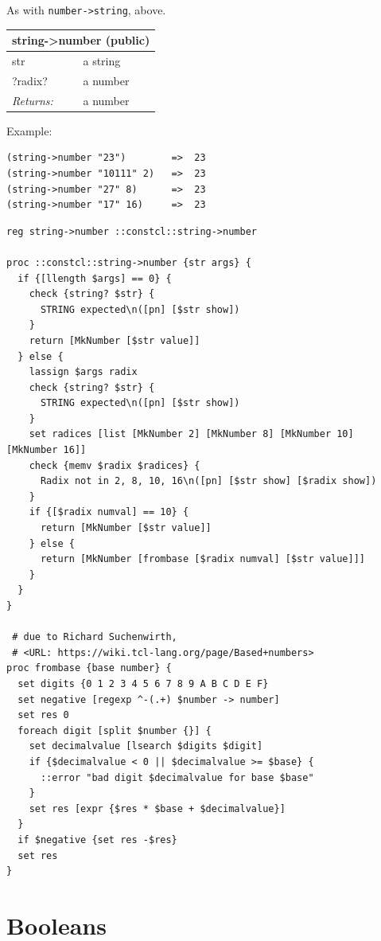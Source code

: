 \documentclass[twoside,9pt]{report}
\begin{document}
As with \texttt{number->string}, above.

\begin{tabular}{ |l l| }
\hline
\multicolumn{2}{|l|}{string->number (public)} \\
\hline
str & a string \\
?radix? & a number \\
\textit{Returns:} & a number \\
\hline
\end{tabular}


Example:

\noindent\makebox[\linewidth]{\rule{\linewidth}{0.4pt}}
\begin{lstlisting}
(string->number "23")        =>  23
(string->number "10111" 2)   =>  23
(string->number "27" 8)      =>  23
(string->number "17" 16)     =>  23
\end{lstlisting}
\noindent\makebox[\linewidth]{\rule{\linewidth}{0.4pt}}
\noindent\makebox[\linewidth]{\rule{\linewidth}{0.4pt}}
\begin{lstlisting}
reg string->number ::constcl::string->number
 
proc ::constcl::string->number {str args} {
  if {[llength $args] == 0} {
    check {string? $str} {
      STRING expected\n([pn] [$str show])
    }
    return [MkNumber [$str value]]
  } else {
    lassign $args radix
    check {string? $str} {
      STRING expected\n([pn] [$str show])
    }
    set radices [list [MkNumber 2] [MkNumber 8] [MkNumber 10] [MkNumber 16]]
    check {memv $radix $radices} {
      Radix not in 2, 8, 10, 16\n([pn] [$str show] [$radix show])
    }
    if {[$radix numval] == 10} {
      return [MkNumber [$str value]]
    } else {
      return [MkNumber [frombase [$radix numval] [$str value]]]
    }
  }
}
 
 # due to Richard Suchenwirth,
 # <URL: https://wiki.tcl-lang.org/page/Based+numbers>
proc frombase {base number} {
  set digits {0 1 2 3 4 5 6 7 8 9 A B C D E F}
  set negative [regexp ^-(.+) $number -> number]
  set res 0
  foreach digit [split $number {}] {
    set decimalvalue [lsearch $digits $digit]
    if {$decimalvalue < 0 || $decimalvalue >= $base} {
      ::error "bad digit $decimalvalue for base $base"
    }
    set res [expr {$res * $base + $decimalvalue}]
  }
  if $negative {set res -$res}
  set res
}
\end{lstlisting}
\noindent\makebox[\linewidth]{\rule{\linewidth}{0.4pt}}
\section{Booleans}
\label{booleans}
\end{document}
